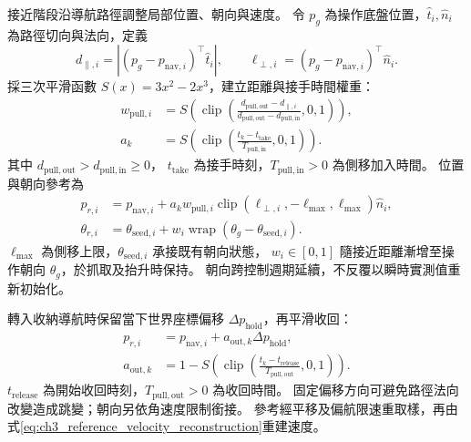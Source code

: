 接近階段沿導航路徑調整局部位置、朝向與速度。
令 $p_g$ 為操作底盤位置，$\hat t_i,\hat n_i$ 為路徑切向與法向，定義
\begin{equation}
    d_{\parallel,i}
    =|(p_g-p_{\mathrm{nav},i})^\top\hat t_i|,
    \qquad
    \ell_{\perp,i}
    =(p_g-p_{\mathrm{nav},i})^\top\hat n_i.
    \label{eq:ch3_navigation_pull_geometry}
\end{equation}
採三次平滑函數 $S(x)=3x^2-2x^3$，建立距離與接手時間權重：
\begin{equation}
    \begin{aligned}
        w_{\mathrm{pull},i}
        &=S\!\left(\operatorname{clip}
        \left(\frac{d_{\mathrm{pull,out}}-d_{\parallel,i}}
        {d_{\mathrm{pull,out}}-d_{\mathrm{pull,in}}},0,1\right)\right),\\
        a_k&=S\!\left(\operatorname{clip}
        \left(\frac{t_k-t_{\mathrm{take}}}{T_{\mathrm{pull,in}}},0,1\right)\right).
    \end{aligned}
    \label{eq:ch3_navigation_pull_weight}
\end{equation}
其中 $d_{\mathrm{pull,out}}>d_{\mathrm{pull,in}}\geq0$，
$t_{\mathrm{take}}$ 為接手時刻，$T_{\mathrm{pull,in}}>0$ 為側移加入時間。
位置與朝向參考為
\begin{equation}
    \begin{aligned}
        p_{r,i}&=p_{\mathrm{nav},i}
        +a_k w_{\mathrm{pull},i}
        \operatorname{clip}(\ell_{\perp,i},-\ell_{\max},\ell_{\max})\hat n_i,\\
        \theta_{r,i}&=\theta_{\mathrm{seed},i}
        +w_i\operatorname{wrap}(\theta_g-\theta_{\mathrm{seed},i}).
    \end{aligned}
    \label{eq:ch3_navigation_local_pull}
\end{equation}
$\ell_{\max}$ 為側移上限，$\theta_{\mathrm{seed},i}$ 承接既有朝向狀態，
$w_i\in[0,1]$ 隨接近距離漸增至操作朝向 $\theta_g$，於抓取及抬升時保持。
朝向跨控制週期延續，不反覆以瞬時實測值重新初始化。

轉入收納導航時保留當下世界座標偏移 $\Delta p_{\mathrm{hold}}$，再平滑收回：
\begin{equation}
    \begin{aligned}
        p_{r,i}&=p_{\mathrm{nav},i}
        +a_{\mathrm{out},k}\Delta p_{\mathrm{hold}},\\
        a_{\mathrm{out},k}
        &=1-S\!\left(\operatorname{clip}
        \left(\frac{t_k-t_{\mathrm{release}}}{T_{\mathrm{pull,out}}},0,1\right)\right).
    \end{aligned}
    \label{eq:ch3_navigation_pull_release}
\end{equation}
$t_{\mathrm{release}}$ 為開始收回時刻，$T_{\mathrm{pull,out}}>0$ 為收回時間。
固定偏移方向可避免路徑法向改變造成跳變；朝向另依角速度限制銜接。
參考經平移及偏航限速重取樣，再由式\eqref{eq:ch3_reference_velocity_reconstruction}重建速度。

